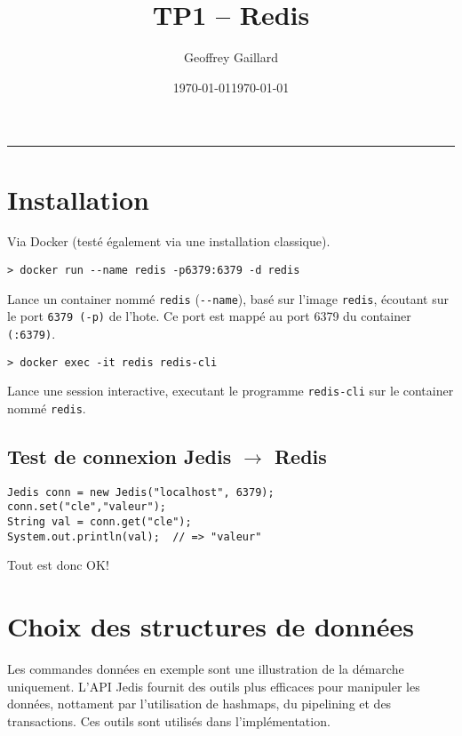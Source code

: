 \documentclass[article,a4paper,12pt]{article}
\author{Geoffrey Gaillard}
\date{\today}
\title{}
\begin{document}
\setcounter{tocdepth}{3}

\title{TP1 -- Redis}
\date{\today}

\maketitle{}

\rule{\linewidth}{0.5pt}



\section{Installation}
\label{sec:orgheadline2}

Via Docker (testé également via une installation classique).


\begin{verbatim}
> docker run --name redis -p6379:6379 -d redis
\end{verbatim}

Lance un container nommé \texttt{redis} (\texttt{-{}-name}), basé sur l'image \texttt{redis},
écoutant sur le port \texttt{6379 (-p)} de l'hote. Ce port est mappé au port 6379 du
container \texttt{(:6379)}.

\begin{verbatim}
> docker exec -it redis redis-cli
\end{verbatim}

Lance une session interactive, executant le programme \texttt{redis-cli} sur le
container nommé \texttt{redis}.


\subsection{Test de connexion Jedis \(\rightarrow\) Redis}
\label{sec:orgheadline1}

\begin{verbatim}
Jedis conn = new Jedis("localhost", 6379);
conn.set("cle","valeur");
String val = conn.get("cle");
System.out.println(val);  // => "valeur"
\end{verbatim}
Tout est donc OK!


\section{Choix des structures de données}
\label{sec:orgheadline11}

Les commandes données en exemple sont une illustration de la démarche
uniquement. L'API Jedis fournit des outils plus efficaces pour manipuler les
données, nottament par l'utilisation de hashmaps, du pipelining et des
transactions. Ces outils sont utilisés dans l'implémentation.
\end{document}
